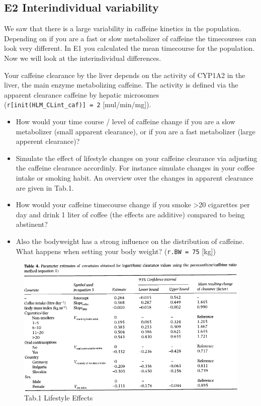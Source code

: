 \documentclass[11pt]{article}
\makeatletter
\def\maxwidth{\ifdim\Gin@nat@width>\linewidth\linewidth
    \else\Gin@nat@width\fi}
\let\Oldincludegraphics\includegraphics
\renewcommand{\includegraphics}[1]{\Oldincludegraphics[width=.8\maxwidth]{#1}}
\providecommand{\tightlist}{%
      \setlength{\itemsep}{0pt}\setlength{\parskip}{0pt}}
\makeatother
\begin{document}
\subsection{E2 Interindividual
variability}\label{e2-interindividual-variability}

We saw that there is a large variability in caffeine kinetics in the
population. Depending on if you are a fast or slow metabolizer of
caffeine the timecourses can look very different. In E1 you calculated
the mean timecourse for the population. Now we will look at the
interindividual differences.

Your caffeine clearance by the liver depends on the activity of CYP1A2
in the liver, the main enzyme metabolizing caffeine. The activity is
defined via the apparent clearance caffeine by hepatic microsomes
(\texttt{r{[}init(\textquotesingle{}HLM\_CLint\_caf\textquotesingle{}){]}\ =\ 2}
{[}mul/min/mg{]}).

\begin{itemize}
\tightlist
\item
  How would your time course / level of caffeine change if you are a
  slow metabolizer (small apparent clearance), or if you are a fast
  metabolizer (large apperent clearance)?
\item
  Simulate the effect of lifestyle changes on your caffeine clearance
  via adjusting the caffeine clearance accordinly. For instance simulate
  changes in your coffee intake or smoking habit. An overview over the
  changes in apparent clearance are given in Tab.1.
\item
  How would your caffeine timecourse change if you smoke
  \textgreater{}20 cigarettes per day and drink 1 liter of coffee (the
  effects are additive) compared to being abstinent?
\item
  Also the bodyweight has a strong influence on the distribution of
  caffeine. What happens when setting your body weight?
  (\texttt{r.BW\ =\ 75} {[}kg{]})
\end{itemize}

\begin{figure}[htbp]
\centering
\includegraphics{figures/Tantcheva-Poor1999_Tab4.png}
\caption{Tab.1 Lifestyle Effects}
\end{figure}


    
    
    
    
\end{document}
